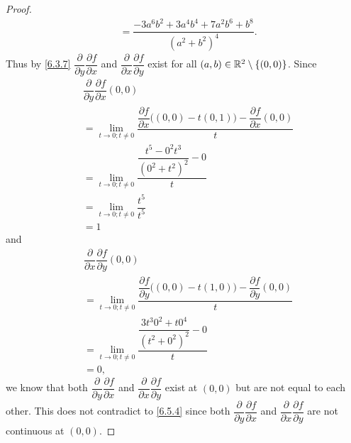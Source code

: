 \begin{proof}
\begin{align*}
     & = \dfrac{-3 a^6 b^2 + 3 a^4 b^4 + 7 a^2 b^6 + b^8}{(a^2 + b^2)^4}.
  \end{align*}
  Thus by \cref{6.3.7} \(\dfrac{\partial}{\partial y} \dfrac{\partial f}{\partial x}\) and \(\dfrac{\partial}{\partial x} \dfrac{\partial f}{\partial y}\) exist for all \((a, b) \in \mathbb{R}^2 \setminus \{(0, 0)\}\).
  Since
  \begin{align*}
     & \dfrac{\partial}{\partial y} \dfrac{\partial f}{\partial x}(0, 0)                                                                      \\
     & = \lim_{t \to 0 ; t \neq 0} \dfrac{\dfrac{\partial f}{\partial x}\big((0, 0) - t(0, 1)\big) - \dfrac{\partial f}{\partial x}(0, 0)}{t} \\
     & = \lim_{t \to 0 ; t \neq 0} \dfrac{\dfrac{t^5 - 0^2 t^3}{(0^2 + t^2)^2} - 0}{t}                                                        \\
     & = \lim_{t \to 0 ; t \neq 0} \dfrac{t^5}{t^5}                                                                                           \\
     & = 1
  \end{align*}
  and
  \begin{align*}
     & \dfrac{\partial}{\partial x} \dfrac{\partial f}{\partial y}(0, 0)                                                                      \\
     & = \lim_{t \to 0 ; t \neq 0} \dfrac{\dfrac{\partial f}{\partial y}\big((0, 0) - t(1, 0)\big) - \dfrac{\partial f}{\partial y}(0, 0)}{t} \\
     & = \lim_{t \to 0 ; t \neq 0} \dfrac{\dfrac{3 t^3 0^2 + t 0^4}{(t^2 + 0^2)^2} - 0}{t}                                                    \\
     & = 0,
  \end{align*}
  we know that both \(\dfrac{\partial}{\partial y} \dfrac{\partial f}{\partial x}\) and \(\dfrac{\partial}{\partial x} \dfrac{\partial f}{\partial y}\) exist at \((0, 0)\) but are not equal to each other.
  This does not contradict to \cref{6.5.4} since both \(\dfrac{\partial}{\partial y} \dfrac{\partial f}{\partial x}\) and \(\dfrac{\partial}{\partial x} \dfrac{\partial f}{\partial y}\) are not continuous at \((0, 0)\).
\end{proof}